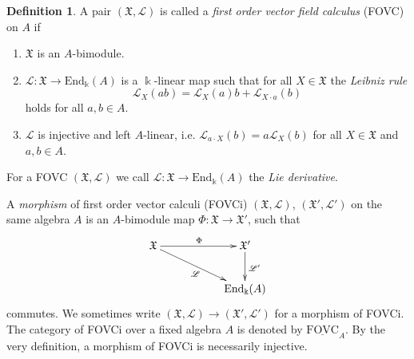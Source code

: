\documentclass{article}
\theoremstyle{definition}
\newtheorem{definition}[thm]{Definition}
\begin{document}
	\begin{definition}\label{def:FOVC} 
		A {pair} $(\mathfrak{X},\mathscr{L})$ is called a \textit{first order vector field calculus} (FOVC) on $A$ if
		\begin{enumerate}
			\item[i.)] $\mathfrak{X}$ is an $A$-bimodule.
			
			\item[ii.)] $\mathscr{L}\colon\mathfrak{X}\to\mathrm{End}_\Bbbk(A)$ is a $\Bbbk$-linear map such that for all $X\in\mathfrak{X}$ the \textit{Leibniz rule}
			\begin{equation}
				\mathscr{L}_X(ab)=\mathscr{L}_X(a)b+\mathscr{L}_{X\cdot a}(b)
			\end{equation}
			holds for all $a,b\in A$.
			
			\item[iii.)] $\mathscr{L}$ is injective and left $A$-linear, i.e. $\mathscr{L}_{a\cdot X}(b)=a\mathscr{L}_X(b)$ for all $X\in\mathfrak{X}$ and $a,b\in A$.
		\end{enumerate}
		For a FOVC $(\mathfrak{X},\mathscr{L})$ we call $\mathscr{L}\colon\mathfrak{X}\to\mathrm{End}_\Bbbk(A)$ the \textit{Lie derivative}.
	\end{definition}
	
	A \textit{morphism} of first order vector calculi (FOVCi) $(\mathfrak{X},\mathscr{L})$, $(\mathfrak{X'},\mathscr{L'})$ 
	on the same algebra $A$ is
	an $A$-bimodule map $\Phi\colon\mathfrak{X} \longrightarrow \mathfrak{X'}$, such
	that
	\begin{equation}\label{diagr-vc}
		\xymatrix{ \mathfrak{X}\ar[rr]^{\Phi}
			\ar[drr]_{\mathscr{L}} & & \mathfrak{X'}\ar[d]^{\mathscr{L'}} \\
			& & \mathrm{End}_\Bbbk(A)
		}
	\end{equation}
	commutes. We sometimes write $(\mathfrak{X},\mathscr{L})\to(\mathfrak{X'},\mathscr{L'})$ for a morphism of FOVCi. The category of FOVCi over a fixed algebra $A$ is denoted by $\underline{\mathrm{FOVC}}_A$. By the very definition, a morphism of FOVCi is necessarily injective.
	
\end{document}
